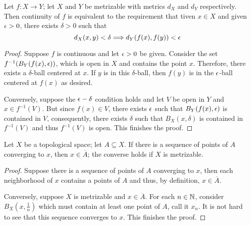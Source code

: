 \begin{theorem}
    Let $f:X\to Y$; let $X$ and $Y$ be metrizable with metrics $d_X$ and $d_Y$ respectively. Then continuity of $f$ is equivalent to the requirement that tiven $x\in X$ and given $\epsilon > 0$, there exists $\delta > 0$ such that 
    \begin{equation*}
        d_X(x,y) <\delta \Longrightarrow d_Y(f(x), f(y)) < \epsilon
    \end{equation*}
\end{theorem}
\begin{proof}
    Suppose $f$ is continuous and let $\epsilon > 0$ be given. Consider the set $f^{-1}(B_Y(f(x), \epsilon))$, which is open in $X$ and contains the point $x$. Therefore, there exists a $\delta$-ball centered at $x$. If $y$ is in this $\delta$-ball, then $f(y)$ is in the $\epsilon$-ball centered at $f(x)$ as desired.

    Conversely, suppose the $\epsilon-\delta$ condition holds and let $V$ be open in $Y$ and $x\in f^{-1}(V)$. But since $f(x)\in V$, there exists $\epsilon$ such that $B_Y(f(x),\epsilon)$ is contained in $V$, consequently, there exists $\delta$ such that $B_X(x, \delta)$ is contained in $f^{-1}(V)$ and thus $f^{-1}(V)$ is open. This finishes the proof.
\end{proof}

\begin{lemma}
    Let $X$ be a topological space; let $A\subseteq X$. If there is a sequence of points of $A$ converging to $x$, then $x\in\overline{A}$; the converse holds if $X$ is metrizable.
\end{lemma}
\begin{proof}
    Suppose there is a sequence of points of $A$ converging to $x$, then each neighborhood of $x$ contains a points of $A$ and thus, by definition, $x\in\overline{A}$.

    Conversely, suppose $X$ is metrizable and $x\in\overline{A}$. For each $n\in\mathbb{N}$, consider $B_X(x,\frac{1}{n})$ which must contain at least one point of $A$, call it $x_n$. It is not hard to see that this sequence converges to $x$. This finishes the proof.
\end{proof}

